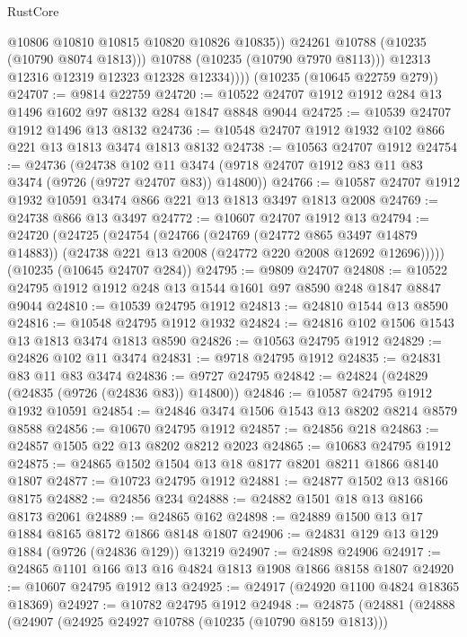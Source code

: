 \begin{lexlean}{RustCore}
\begin{coremodule}
                    @10806
                    @10810
                    @10815
                    @10820
                    @10826
                    @10835))
                @24261
                @10788
                (@10235 (@10790 @8074 @1813)))
              @10788
              (@10235 (@10790 @7970 @8113)))
            @12313
            @12316
            @12319
            @12323
            @12328
            @12334))))
    (@10235 (@10645 @22759 @279))
@24707 := @9814 @22759
@24720 := @10522 @24707 @1912 @1912 @284 @13 @1496 @1602 @97 @8132 @284 @1847 @8848 @9044
@24725 := @10539 @24707 @1912 @1496 @13 @8132
@24736 := @10548 @24707 @1912 @1932 @102 @866 @221 @13 @1813 @3474 @1813 @8132
@24738 := @10563 @24707 @1912
@24754 := @24736
    (@24738 @102 @11 @3474 (@9718 @24707 @1912 @83 @11 @83 @3474 (@9726 (@9727 @24707 @83)) @14800))
@24766 := @10587 @24707 @1912 @1932 @10591 @3474 @866 @221 @13 @1813 @3497 @1813 @2008
@24769 := @24738 @866 @13 @3497
@24772 := @10607 @24707 @1912 @13
@24794 := @24720
    (@24725
      (@24754
        (@24766
          (@24769 (@24772 @865 @3497 @14879 @14883))
          (@24738 @221 @13 @2008 (@24772 @220 @2008 @12692 @12696)))))
    (@10235 (@10645 @24707 @284))
@24795 := @9809 @24707
@24808 := @10522 @24795 @1912 @1912 @248 @13 @1544 @1601 @97 @8590 @248 @1847 @8847 @9044
@24810 := @10539 @24795 @1912
@24813 := @24810 @1544 @13 @8590
@24816 := @10548 @24795 @1912 @1932
@24824 := @24816 @102 @1506 @1543 @13 @1813 @3474 @1813 @8590
@24826 := @10563 @24795 @1912
@24829 := @24826 @102 @11 @3474
@24831 := @9718 @24795 @1912
@24835 := @24831 @83 @11 @83 @3474
@24836 := @9727 @24795
@24842 := @24824 (@24829 (@24835 (@9726 (@24836 @83)) @14800))
@24846 := @10587 @24795 @1912 @1932 @10591
@24854 := @24846 @3474 @1506 @1543 @13 @8202 @8214 @8579 @8588
@24856 := @10670 @24795 @1912
@24857 := @24856 @218
@24863 := @24857 @1505 @22 @13 @8202 @8212 @2023
@24865 := @10683 @24795 @1912
@24875 := @24865 @1502 @1504 @13 @18 @8177 @8201 @8211 @1866 @8140 @1807
@24877 := @10723 @24795 @1912
@24881 := @24877 @1502 @13 @8166 @8175
@24882 := @24856 @234
@24888 := @24882 @1501 @18 @13 @8166 @8173 @2061
@24889 := @24865 @162
@24898 := @24889 @1500 @13 @17 @1884 @8165 @8172 @1866 @8148 @1807
@24906 := @24831 @129 @13 @129 @1884 (@9726 (@24836 @129)) @13219
@24907 := @24898 @24906
@24917 := @24865 @1101 @166 @13 @16 @4824 @1813 @1908 @1866 @8158 @1807
@24920 := @10607 @24795 @1912 @13
@24925 := @24917 (@24920 @1100 @4824 @18365 @18369)
@24927 := @10782 @24795 @1912
@24948 := @24875
    (@24881
      (@24888
        (@24907
          (@24925 @24927 @10788 (@10235 (@10790 @8159 @1813)))

\end{coremodule}
\end{lexlean}
